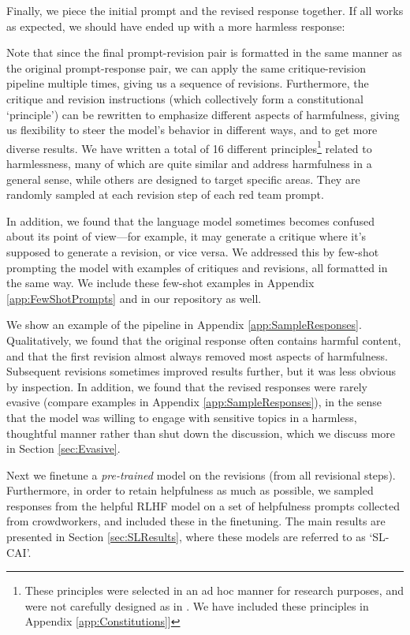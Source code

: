 Finally, we piece the initial prompt and the revised response together. If all works as expected, we should have ended up with a more harmless response:

Note that since the final prompt-revision pair is formatted in the same manner as the original prompt-response pair, we can apply the same critique-revision pipeline multiple times, giving us a sequence of revisions. Furthermore, the critique and revision instructions (which collectively form a constitutional `principle') can be rewritten to emphasize different aspects of harmfulness, giving us flexibility to steer the model's behavior in different ways, and to get more diverse results. We have written a total of 16 different principles\footnote{These principles were selected in an ad hoc manner for research purposes, and were not carefully designed as in \cite{SparrowDM}. We have included these principles in Appendix \ref{app:Constitutions}]} related to harmlessness, many of which are quite similar and address harmfulness in a general sense, while others are designed to target specific areas.  They are randomly sampled at each revision step of each red team prompt. 

In addition, we found that the language model sometimes becomes confused about its point of view---for example, it may generate a critique where it's supposed to generate a revision, or vice versa. We addressed this by few-shot prompting the model with examples of critiques and revisions, all formatted in the same way. We include these few-shot examples in Appendix \ref{app:FewShotPrompts} and in our repository as well.

We show an example of the pipeline in Appendix \ref{app:SampleResponses}. Qualitatively, we found that the original response often contains harmful content, and that the first revision almost always removed most aspects of harmfulness. Subsequent revisions sometimes improved results further, but it was less obvious by inspection. In addition, we found that the revised responses were rarely evasive (compare examples in Appendix \ref{app:SampleResponses}), in the sense that the model was willing to engage with sensitive topics in a harmless, thoughtful manner rather than shut down the discussion, which we discuss more in Section \ref{sec:Evasive}.

Next we finetune a {\it pre-trained} model on the revisions (from all revisional steps). Furthermore, in order to retain helpfulness as much as possible, we sampled responses from the helpful RLHF model on a set of helpfulness prompts collected from crowdworkers, and included these in the finetuning. The main results are presented in Section \ref{sec:SLResults}, where these models are referred to as `SL-CAI'.

